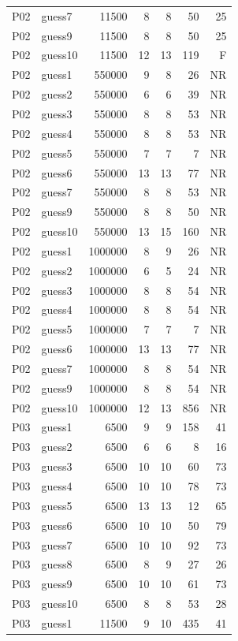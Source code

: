 {\begin{longtable}{llrrrrr}
P02 & guess7 & 11500 & 8 & 8 & 50 & 25 \\
P02 & guess9 & 11500 & 8 & 8 & 50 & 25 \\
P02 & guess10 & 11500 & 12 & 13 & 119 & F \\
P02 & guess1 & 550000 & 9 & 8 & 26 & NR \\
P02 & guess2 & 550000 & 6 & 6 & 39 & NR \\
P02 & guess3 & 550000 & 8 & 8 & 53 & NR \\
P02 & guess4 & 550000 & 8 & 8 & 53 & NR \\
P02 & guess5 & 550000 & 7 & 7 & 7 & NR \\
P02 & guess6 & 550000 & 13 & 13 & 77 & NR \\
P02 & guess7 & 550000 & 8 & 8 & 53 & NR \\
P02 & guess9 & 550000 & 8 & 8 & 50 & NR \\
P02 & guess10 & 550000 & 13 & 15 & 160 & NR \\
P02 & guess1 & 1000000 & 8 & 9 & 26 & NR \\
P02 & guess2 & 1000000 & 6 & 5 & 24 & NR \\
P02 & guess3 & 1000000 & 8 & 8 & 54 & NR \\
P02 & guess4 & 1000000 & 8 & 8 & 54 & NR \\
P02 & guess5 & 1000000 & 7 & 7 & 7 & NR \\
P02 & guess6 & 1000000 & 13 & 13 & 77 & NR \\
P02 & guess7 & 1000000 & 8 & 8 & 54 & NR \\
P02 & guess9 & 1000000 & 8 & 8 & 54 & NR \\
P02 & guess10 & 1000000 & 12 & 13 & 856 & NR \\
P03 & guess1 & 6500 & 9 & 9 & 158 & 41 \\
P03 & guess2 & 6500 & 6 & 6 & 8 & 16 \\
P03 & guess3 & 6500 & 10 & 10 & 60 & 73 \\
P03 & guess4 & 6500 & 10 & 10 & 78 & 73 \\
P03 & guess5 & 6500 & 13 & 13 & 12 & 65 \\
P03 & guess6 & 6500 & 10 & 10 & 50 & 79 \\
P03 & guess7 & 6500 & 10 & 10 & 92 & 73 \\
P03 & guess8 & 6500 & 8 & 9 & 27 & 26 \\
P03 & guess9 & 6500 & 10 & 10 & 61 & 73 \\
P03 & guess10 & 6500 & 8 & 8 & 53 & 28 \\
P03 & guess1 & 11500 & 9 & 10 & 435 & 41 \\

\end{longtable}}

